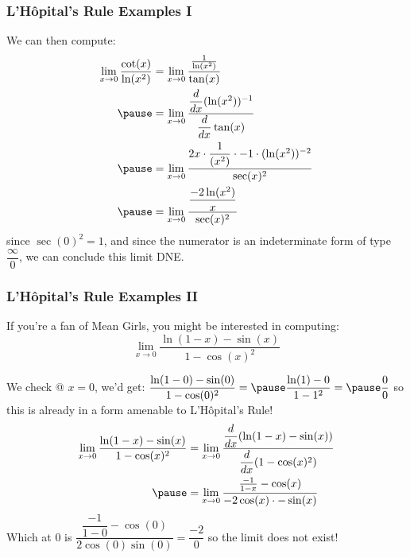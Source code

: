 \documentclass{ltx-talk}
\begin{document}
\begin{frame}
  \frametitle{L'Hôpital's Rule Examples I}
  We can then compute:
  \begin{align}
    \lim\limits_{x \rightarrow 0} \dfrac{\cot(x)}{\ln(x^2)} &= \lim\limits_{x \rightarrow 0} \dfrac{\frac{1}{\ln(x^2)}}{\tan(x)} \\ \pause
                                                            &= \lim\limits_{x \rightarrow 0} \dfrac{\dfrac{d}{dx}(\ln(x^2))^{-1}}{\dfrac{d}{dx} \tan(x)} \\ \pause
                                                            &= \lim\limits_{x \rightarrow 0} \dfrac{2x \cdot \dfrac{1}{(x^2)} \cdot -1 \cdot (\ln(x^2))^{-2}}{\sec(x)^2} \\ \pause
                                                            &= \lim\limits_{x \rightarrow 0}\dfrac{ \dfrac{-2 \ln(x^2)}{x}}{\sec(x)^2}
  \end{align}
  since $\sec(0)^2 = 1$, and since the numerator is an indeterminate form of type $\dfrac{\infty}{0}$, we can conclude this limit DNE.
\end{frame}

\begin{frame}
  \frametitle{L'Hôpital's Rule Examples II}
  If you're a fan of Mean Girls, you might be interested in computing:
  \begin{equation}
    \lim\limits_{x \rightarrow 0} \dfrac{\ln(1 - x) - \sin(x)}{1 - \cos(x)^2}
  \end{equation} \pause

  We check @ $x = 0$, we'd get:
    $\dfrac{\ln(1 - 0) - \sin(0)}{1 - \cos(0)^2} = \pause \dfrac{\ln(1) - 0}{1 - 1^2} = \pause \dfrac{0}{0}$
  so this is already in a form amenable to L'Hôpital's Rule! \pause
  \begin{align}
    \lim\limits_{x \rightarrow 0} \dfrac{\ln(1 - x) - \sin(x)}{1 - \cos(x)^2} &= \lim\limits_{x \rightarrow 0} \dfrac{\dfrac{d}{dx} (\ln(1 - x) - \sin(x))}{\dfrac{d}{dx} (1 - \cos(x)^2)} \\ \pause
                                                                                            &= \lim\limits_{x \rightarrow 0} \dfrac{\frac{-1}{1 - x} - \cos(x)}{-2 \cos(x) \cdot - \sin(x)}
  \end{align} \pause
  Which at $0$ is $\dfrac{\dfrac{-1}{1 - 0} - \cos(0)}{2 \cos(0) \sin(0)} = \dfrac{-2}{0}$ so \pause the limit does not exist!
\end{frame}
\end{document}
